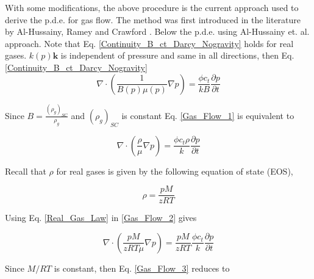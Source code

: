 \documentclass{llncs}
\numberwithin{equation}{section}
\numberwithin{figure}{section}
\numberwithin{table}{section}
\begin{document}
    With some modifications, the above procedure is the current approach used to derive the p.d.e. for gas flow. The method was first introduced in the literature by Al-Hussainy, Ramey and Crawford \cite{Al-Hussainy_1966_1}. Below the p.d.e.  using Al-Hussainy et. al. \cite{Al-Hussainy_1966_1} approach.  Note that Eq. \ref{Continuity_B_ct_Darcy_Nogravity} holds for real gases.  $k(p)\mathbf{k}$ is independent of pressure and same in all directions, then Eq. \ref{Continuity_B_ct_Darcy_Nogravity} 
    \begin{equation}   
        \nabla \cdot \left( \frac{1}{B\left( p \right)\mu \left( p \right)}\nabla p \right)=\frac{\phi {{c}_{t}}}{kB}\frac{\partial p}{\partial t}
        \label{Gas_Flow_1}
    \end{equation}   
    
    Since $B=\frac{{{\left( {{\rho }_{g}} \right)}_{SC}}}{{{\rho }_{g}}}$ and ${{\left( {{\rho }_{g}} \right)}_{SC}}$ is constant Eq. \ref{Gas_Flow_1} is equivalent to
    
    \begin{equation}
        \nabla \cdot \left( \frac{\rho }{\mu }\nabla p \right)=\frac{\phi {{c}_{t}}\rho }{k}\frac{\partial p}{\partial t}
        \label{Gas_Flow_2}
    \end{equation}   
     
    Recall that $\rho$ for real gases is given by the following equation of state (EOS),
     
    \begin{equation}
        \rho =\frac{pM}{zRT}
        \label{Real_Gas_Law}
    \end{equation}     
     
    Using Eq. \ref{Real_Gas_Law} in \ref{Gas_Flow_2} gives
    
    \begin{equation}
        \nabla \cdot \left( \frac{pM}{zRT\mu }\nabla p \right)=\frac{pM}{zRT}\frac{\phi {{c}_{t}}}{k}\frac{\partial p}{\partial t}
        \label{Gas_Flow_3}
    \end{equation}      
     
    Since $M/RT$ is constant, then Eq. \ref{Gas_Flow_3} reduces to
    
\end{document}
